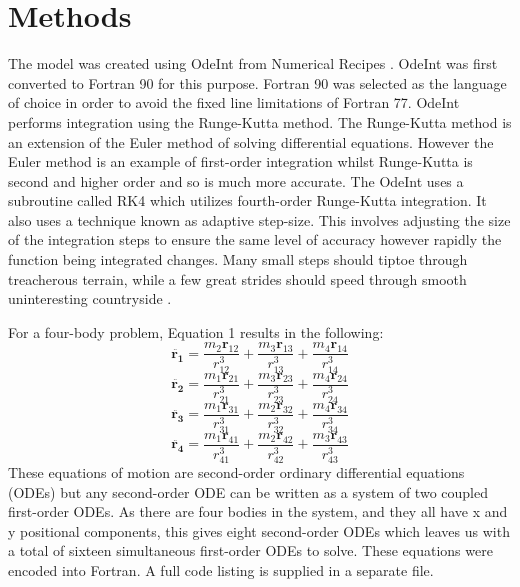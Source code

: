 \documentclass[a4paper,12pt]{article}
\begin{document}
\newpage
\section{Methods}
The model was created using OdeInt from Numerical Recipes \citep{press}. OdeInt was first converted to Fortran 90 for this purpose.
Fortran 90 was selected as the language of choice in order to avoid the fixed line limitations of Fortran 77.
OdeInt performs integration using the Runge-Kutta method. The Runge-Kutta method is an extension of the Euler method of solving differential equations. However the Euler method
is an example of first-order integration whilst Runge-Kutta is second and higher order and so is much more accurate. The OdeInt uses a subroutine called RK4 which utilizes fourth-order Runge-Kutta integration.
It also uses a technique known as adaptive step-size. This involves adjusting the size of the integration steps to ensure the same level of accuracy however rapidly the function being integrated changes.
Many small steps should tiptoe through treacherous terrain, while a few great strides should speed through smooth uninteresting countryside \citep{press}.

For a four-body problem, Equation 1 results in the following:
\begin{equation}
\ddot{\mathbf{r_1}}=\frac{m_2\mathbf{r}_{12}}{r^3_{12}}+\frac{m_3\mathbf{r}_{13}}{r^3_{13}}+\frac{m_4\mathbf{r}_{14}}{r^3_{14}}
\end{equation}
\begin{equation}
\ddot{\mathbf{r_2}}=\frac{m_1\mathbf{r}_{21}}{r^3_{21}}+\frac{m_3\mathbf{r}_{23}}{r^3_{23}}+\frac{m_4\mathbf{r}_{24}}{r^3_{24}}
\end{equation}
\begin{equation}
\ddot{\mathbf{r_3}}=\frac{m_1\mathbf{r}_{31}}{r^3_{31}}+\frac{m_2\mathbf{r}_{32}}{r^3_{32}}+\frac{m_4\mathbf{r}_{34}}{r^3_{34}}
\end{equation}
\begin{equation}
\ddot{\mathbf{r_4}}=\frac{m_1\mathbf{r}_{41}}{r^3_{41}}+\frac{m_2\mathbf{r}_{42}}{r^3_{42}}+\frac{m_3\mathbf{r}_{43}}{r^3_{43}}
\end{equation}
These equations of motion are second-order ordinary differential equations (ODEs) but any second-order ODE can be written as a system
of two coupled first-order ODEs. As there are four bodies in the system, and they all have x and y positional components, this gives eight second-order 
ODEs which leaves us with a total of sixteen simultaneous first-order ODEs to solve.
These equations were encoded into Fortran. 
A full code listing is supplied in a separate file.
\end{document}
